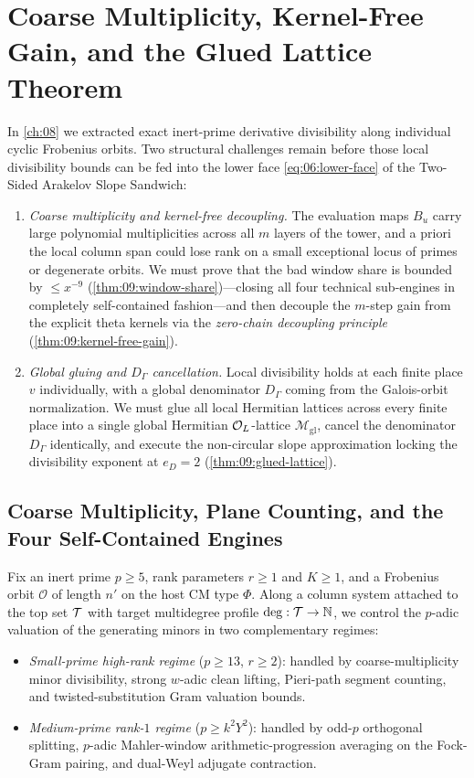 \chapter{Coarse Multiplicity, Kernel-Free Gain, and the Glued Lattice Theorem}
\label{ch:09}

In \cref{ch:08} we extracted exact inert-prime derivative divisibility along individual cyclic Frobenius orbits. Two structural challenges remain before those local divisibility bounds can be fed into the lower face \eqref{eq:06:lower-face} of the Two-Sided Arakelov Slope Sandwich:
\begin{enumerate}[label=(\roman*)]
\item \emph{Coarse multiplicity and kernel-free decoupling.} The evaluation maps $B_u$ carry large polynomial multiplicities across all $m$ layers of the tower, and a priori the local column span could lose rank on a small exceptional locus of primes or degenerate orbits. We must prove that the bad window share is bounded by $\le x^{-9}$ (\cref{thm:09:window-share})—closing all four technical sub-engines in completely self-contained fashion—and then decouple the $m$-step gain from the explicit theta kernels via the \emph{zero-chain decoupling principle} (\cref{thm:09:kernel-free-gain}).
\item \emph{Global gluing and $D_\Gamma$ cancellation.} Local divisibility holds at each finite place $v$ individually, with a global denominator $D_\Gamma$ coming from the Galois-orbit normalization. We must glue all local Hermitian lattices across every finite place into a single global Hermitian $\mathcal{O}_L$-lattice $\mathcal{M}_{\mathrm{gl}}$, cancel the denominator $D_\Gamma$ identically, and execute the non-circular slope approximation locking the divisibility exponent at $e_D = 2$ (\cref{thm:09:glued-lattice}).
\end{enumerate}

\section{Coarse Multiplicity, Plane Counting, and the Four Self-Contained Engines}
\label{sec:09:coarse-plane}

Fix an inert prime $p \ge 5$, rank parameters $r \ge 1$ and $K \ge 1$, and a Frobenius orbit $\mathcal{O}$ of length $n'$ on the host CM type $\Phi$. Along a column system attached to the top set $\mathcal{T}$ with target multidegree profile $\deg : \mathcal{T} \to \mathbb{N}$, we control the $p$-adic valuation of the generating minors in two complementary regimes:
\begin{itemize}
\item \emph{Small-prime high-rank regime} ($p \ge 13$, $r \ge 2$): handled by coarse-multiplicity minor divisibility, strong $w$-adic clean lifting, Pieri-path segment counting, and twisted-substitution Gram valuation bounds.
\item \emph{Medium-prime rank-$1$ regime} ($p \ge k^2 Y^2$): handled by odd-$p$ orthogonal splitting, $p$-adic Mahler-window arithmetic-progression averaging on the Fock-Gram pairing, and dual-Weyl adjugate contraction.
\end{itemize}

